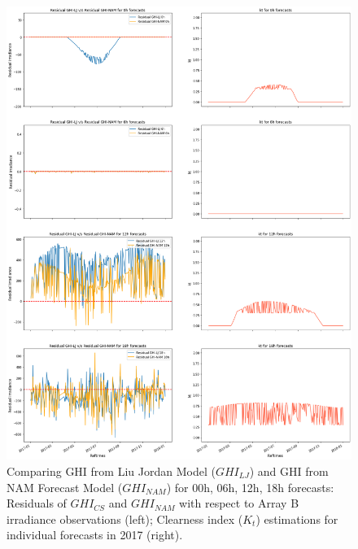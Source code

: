 \begin{figure}[htbp]
    \begin{center}
    	\includegraphics[width=\textwidth]{chapter4/fig_ghi_comparison_lj.png}
    	\caption[Comparing GHI from Liu Jordan Model ($GHI_{LJ}$) and GHI from NAM Forecast Model ($GHI_{NAM}$) for 00h, 06h, 12h, 18h forecasts in 2017]{Comparing GHI from Liu Jordan Model ($GHI_{LJ}$) and GHI from NAM Forecast Model ($GHI_{NAM}$) for 00h, 06h, 12h, 18h forecasts: Residuals of $GHI_{CS}$ and $GHI_{NAM}$ with respect to Array B irradiance observations (left); Clearness index ($K_t$) estimations for individual forecasts in 2017 (right).}
    	\label{fig:fig_ghi_comparison_lj}
    \end{center}
\end{figure}


